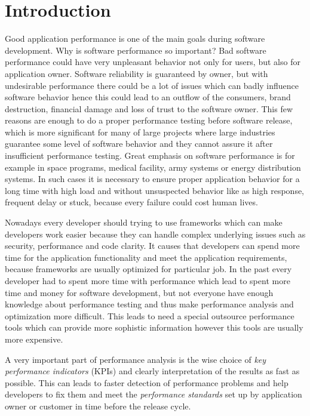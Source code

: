 

\chapter{Introduction}
\label{Introduction}
Good application performance is one of the main goals during software development. Why is software performance so important? Bad software performance could have very unpleasant behavior not only for users, but also for application owner. Software reliability is guaranteed by owner, but with undesirable performance there could be a lot of issues which can badly influence software behavior hence this could lead to an outflow of the consumers, brand destruction, financial damage and loss of trust to the software owner. This few reasons are enough to do a proper performance testing before software release, which is more significant for many of large projects where large industries guarantee some level of software behavior and they cannot assure it after insufficient performance testing. Great emphasis on software performance is for example in space programs, medical facility, army systems or energy distribution systems. In such cases it is necessary to ensure proper application behavior for a long time with high load and without unsuspected behavior like as high response, frequent delay or stuck, because every failure could cost human lives. 

Nowadays every developer should trying to use frameworks which can make developers work easier because they can handle complex underlying issues such as security, performance and code clarity. It causes that developers can spend more time for the application functionality and meet the application requirements, because frameworks are usually optimized for particular job. In the past every developer had to spent more time with performance which lead to spent more time and money for software development, but not everyone have enough knowledge about performance testing and thus make performance analysis and optimization more difficult. This leads to need a special outsource performance tools which can provide more sophistic information however this tools are usually more expensive.

A very important part of performance analysis is the wise choice of \emph{key performance indicators} (KPIs) \cite{Molyneaux:TAoAPT} and clearly interpretation of the results as fast as possible. This can leads to faster detection of performance problems and help developers to fix them and meet the \emph{performance standards} \cite{Molyneaux:TAoAPT} set up by application owner or customer in time before the release cycle. 

